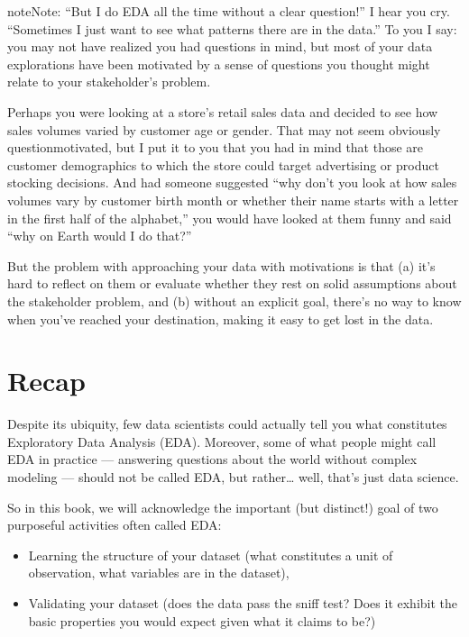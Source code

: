 \documentclass[letterpaper,10pt,english]{jupyterBook}
\begin{document}
\begin{sphinxadmonition}{note}{Note:}
\sphinxAtStartPar
“But I do EDA all the time without a clear question!” I hear you cry. “Sometimes I just want to see what patterns there are in the data.” To you I say: you may not have realized you had questions in mind, but most of your data explorations have been  motivated by a sense of questions you thought might relate to your stakeholder’s problem.

\sphinxAtStartPar
Perhaps you were looking at a store’s retail sales data and decided to see how sales volumes varied by customer age or gender. That may not seem obviously question\sphinxhyphen{}motivated, but I put it to you that you had in mind that those are customer demographics to which the store could target advertising or product stocking decisions. And had someone suggested “why don’t you look at how sales volumes vary by customer birth month or whether their name starts with a letter in the first half of the alphabet,” you would have looked at them funny and said “why on Earth would I do that?”

\sphinxAtStartPar
But the problem with approaching your data with  motivations is that (a) it’s hard to reflect on them or evaluate whether they rest on solid assumptions about the stakeholder problem, and (b) without an explicit goal, there’s no way to know when you’ve reached your destination, making it   easy to get lost in the data.
\end{sphinxadmonition}


\section{Recap}
\label{\detokenize{30_questions/07_eda:recap}}
\sphinxAtStartPar
Despite its ubiquity, few data scientists could actually tell you what constitutes Exploratory Data Analysis (EDA). Moreover, some of what people might call EDA in practice — answering questions about the world without complex modeling — should not be called EDA, but rather… well, that’s just data science.

\sphinxAtStartPar
So in this book, we will acknowledge the important (but distinct!) goal of two purposeful activities often called EDA:
\begin{itemize}
\item {} 
\sphinxAtStartPar
Learning the structure of your dataset (what constitutes a unit of observation, what variables are in the dataset),

\item {} 
\sphinxAtStartPar
Validating your dataset (does the data pass the sniff test? Does it exhibit the basic properties you would expect given what it claims to be?)

\end{itemize}
\end{document}
